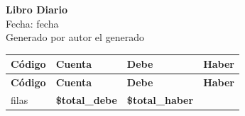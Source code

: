 \documentclass[11pt]{article}
\begin{document}
\begin{center}
    {\LARGE \textbf{Libro Diario}}\\[6pt]
    {\large Fecha: {{fecha}}}\\[3pt]
    {\normalsize Generado por {{autor}} el {{generado}}}
\end{center}

\vspace{0.6cm}

\renewcommand{\arraystretch}{1.35}
\begin{longtable}{p{2.5cm} p{7.5cm} >{\raggedleft\arraybackslash}p{2.8cm} >{\raggedleft\arraybackslash}p{2.8cm}}
    \hline
    \textbf{Código} & \textbf{Cuenta} & \textbf{Debe} & \textbf{Haber} \\
    \hline
    \endfirsthead

    \hline
    \textbf{Código} & \textbf{Cuenta} & \textbf{Debe} & \textbf{Haber} \\
    \hline
    \endhead

{{filas}}
    \hline
    \multicolumn{2}{r}{\textbf{TOTALES}} & \textbf{\${{total_debe}}} & \textbf{\${{total_haber}}} \\
    \hline
\end{longtable}
\end{document}
